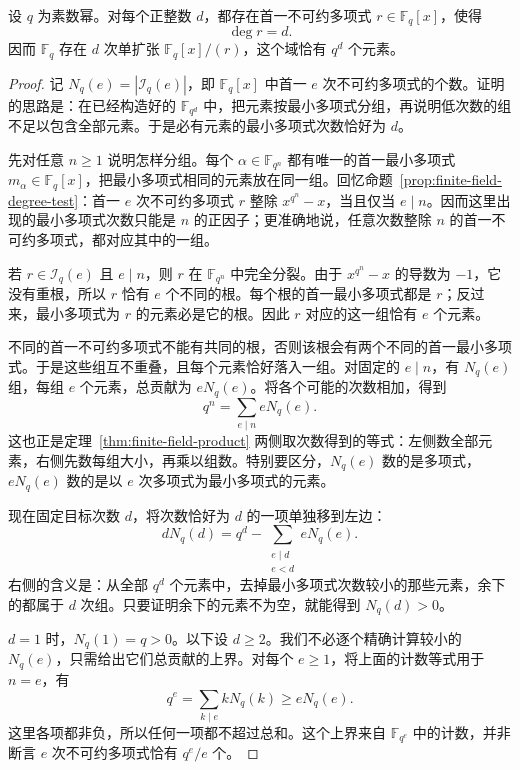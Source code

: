 \documentclass[lang=cn,a4paper,fontset=none,zihao=false,10pt,openany,twoside]{beautybook}
\numberwithin{algorithm}{chapter}
\begin{document}
\begin{theorem}[任意次数不可约多项式的存在]\label{cor:irreducible-every-degree}
设 $q$ 为素数幂。对每个正整数 $d$，都存在首一不可约多项式 $r\in\mathbb F_q[x]$，使得
\[
 \deg r=d.
\]
因而 $\mathbb F_q$ 存在 $d$ 次单扩张 $\mathbb F_q[x]/(r)$，这个域恰有 $q^d$ 个元素。
\end{theorem}
\begin{proof}
记 $N_q(e)=|\mathcal I_q(e)|$，即 $\mathbb F_q[x]$ 中首一 $e$ 次不可约多项式的个数。证明的思路是：在已经构造好的 $\mathbb F_{q^d}$ 中，把元素按最小多项式分组，再说明低次数的组不足以包含全部元素。于是必有元素的最小多项式次数恰好为 $d$。

先对任意 $n\ge1$ 说明怎样分组。每个 $\alpha\in\mathbb F_{q^n}$ 都有唯一的首一最小多项式 $m_\alpha\in\mathbb F_q[x]$，把最小多项式相同的元素放在同一组。回忆命题~\ref{prop:finite-field-degree-test}：首一 $e$ 次不可约多项式 $r$ 整除 $x^{q^n}-x$，当且仅当 $e\mid n$。因而这里出现的最小多项式次数只能是 $n$ 的正因子；更准确地说，任意次数整除 $n$ 的首一不可约多项式，都对应其中的一组。

若 $r\in\mathcal I_q(e)$ 且 $e\mid n$，则 $r$ 在 $\mathbb F_{q^n}$ 中完全分裂。由于 $x^{q^n}-x$ 的导数为 $-1$，它没有重根，所以 $r$ 恰有 $e$ 个不同的根。每个根的首一最小多项式都是 $r$；反过来，最小多项式为 $r$ 的元素必是它的根。因此 $r$ 对应的这一组恰有 $e$ 个元素。

不同的首一不可约多项式不能有共同的根，否则该根会有两个不同的首一最小多项式。于是这些组互不重叠，且每个元素恰好落入一组。对固定的 $e\mid n$，有 $N_q(e)$ 组，每组 $e$ 个元素，总贡献为 $eN_q(e)$。将各个可能的次数相加，得到
\[
 q^n=\sum_{e\mid n}eN_q(e).
\]
这也正是定理~\ref{thm:finite-field-product} 两侧取次数得到的等式：左侧数全部元素，右侧先数每组大小，再乘以组数。特别要区分，$N_q(e)$ 数的是多项式，$eN_q(e)$ 数的是以 $e$ 次多项式为最小多项式的元素。

现在固定目标次数 $d$，将次数恰好为 $d$ 的一项单独移到左边：
\[
 dN_q(d)=q^d-\sum_{\substack{e\mid d\\e<d}}eN_q(e).
\]
右侧的含义是：从全部 $q^d$ 个元素中，去掉最小多项式次数较小的那些元素，余下的都属于 $d$ 次组。只要证明余下的元素不为空，就能得到 $N_q(d)>0$。

$d=1$ 时，$N_q(1)=q>0$。以下设 $d\ge2$。我们不必逐个精确计算较小的 $N_q(e)$，只需给出它们总贡献的上界。对每个 $e\ge1$，将上面的计数等式用于 $n=e$，有
\[
 q^e=\sum_{k\mid e}kN_q(k)\ge eN_q(e).
\]
这里各项都非负，所以任何一项都不超过总和。这个上界来自 $\mathbb F_{q^e}$ 中的计数，并非断言 $e$ 次不可约多项式恰有 $q^e/e$ 个。


\end{proof}
\end{document}
